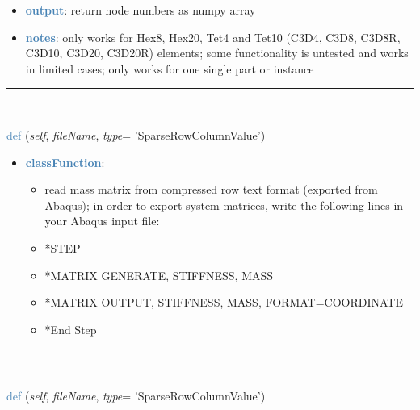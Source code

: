 \begin{itemize}[leftmargin=1.4cm]
\begin{itemize}[leftmargin=1.4cm]
\begin{itemize}[leftmargin=1.4cm]
\begin{itemize}[leftmargin=0.5cm]
\begin{itemize}[leftmargin=1.4cm]
\begin{itemize}[leftmargin=1.4cm]
\begin{itemize}[leftmargin=1.4cm]
\begin{itemize}[leftmargin=0.5cm]
\begin{itemize}[leftmargin=0.7cm]
\begin{itemize}[leftmargin=1.2cm]
\end{itemize}
\item[--]\textcolor{steelblue}{\bf output}: return node numbers as numpy array
\item[--]\textcolor{steelblue}{\bf notes}: only works for Hex8, Hex20, Tet4 and Tet10 (C3D4, C3D8, C3D8R, C3D10, C3D20, C3D20R) elements; some functionality is untested and works in limited cases; only works for one single part or instance
\vspace{12pt}\end{itemize}
%
\noindent\rule{8cm}{0.75pt}\vspace{1pt} \\ 
\begin{flushleft}
\noindent \textcolor{steelblue}{def {\bf {}}}\label{sec:FEM:FEMinterface:ReadMassMatrixFromAbaqus}
({\it self}, {\it fileName}, {\it type}= 'SparseRowColumnValue')
\end{flushleft}
\setlength{\itemindent}{0.7cm}
\begin{itemize}[leftmargin=0.7cm]
\item[--]\textcolor{steelblue}{\bf classFunction}: \vspace{-6pt}
\begin{itemize}[leftmargin=1.2cm]
\setlength{\itemindent}{-0.7cm}
\item[]read mass matrix from compressed row text format (exported from Abaqus); in order to export system matrices, write the following lines in your Abaqus input file:
\item[]*STEP
\item[]*MATRIX GENERATE, STIFFNESS, MASS
\item[]*MATRIX OUTPUT, STIFFNESS, MASS, FORMAT=COORDINATE
\item[]*End Step
\end{itemize}
\vspace{12pt}\end{itemize}
%
\noindent\rule{8cm}{0.75pt}\vspace{1pt} \\ 
\begin{flushleft}
\noindent \textcolor{steelblue}{def {\bf {}}}\label{sec:FEM:FEMinterface:ReadStiffnessMatrixFromAbaqus}
({\it self}, {\it fileName}, {\it type}= 'SparseRowColumnValue')
\end{flushleft}

\end{itemize}
\end{itemize}
\end{itemize}
\end{itemize}
\end{itemize}
\end{itemize}
\end{itemize}
\end{itemize}

